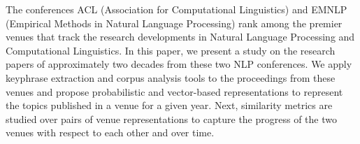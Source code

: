 The conferences ACL (Association for Computational Linguistics) and EMNLP (Empirical Methods in Natural Language Processing) rank among the premier venues that track the research developments in Natural Language Processing and Computational Linguistics. In this paper, we present a study on the research papers of approximately two decades from these two NLP conferences. We apply keyphrase extraction and corpus analysis tools to the proceedings from these venues and propose probabilistic and vector-based representations to represent the topics published in a venue for a given year. Next, similarity metrics are studied over pairs of venue representations to capture the progress of the two venues with respect to each other and over time.
